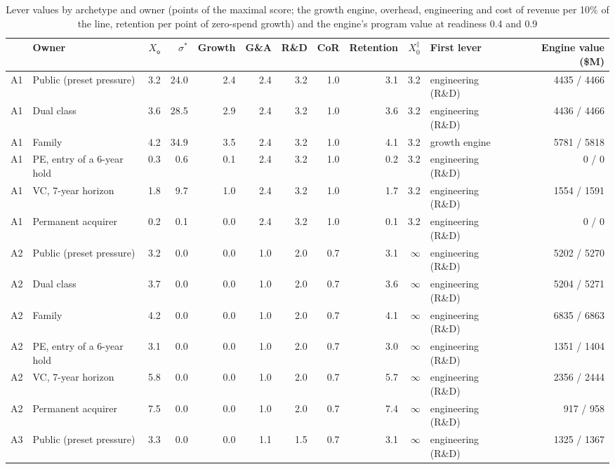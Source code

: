 \begin{table}[p]
\centering
\caption{Lever values by archetype and owner (points of the maximal score; the growth engine, overhead, engineering and cost of revenue per 10\% of the line, retention per point of zero-spend growth) and the engine's program value at readiness 0.4 and 0.9}\label{tab:playbook-grid}
\scriptsize
\setlength{\tabcolsep}{3pt}
\begin{tabular}{@{}llrrrrrrrrlr@{}}
\toprule
 & Owner & $X_{\mathsf o}$ & $\sigma^*$ & Growth & G\&A & R\&D & CoR & Retention & $X^\ddagger_0$ & First lever & Engine value (\$M) \\
\midrule
A1 & Public (preset pressure) & 3.2 & 24.0 & 2.4 & 2.4 & 3.2 & 1.0 & 3.1 & 3.2 & engineering (R\&D) & 4435 / 4466 \\
A1 & Dual class & 3.6 & 28.5 & 2.9 & 2.4 & 3.2 & 1.0 & 3.6 & 3.2 & engineering (R\&D) & 4436 / 4466 \\
A1 & Family & 4.2 & 34.9 & 3.5 & 2.4 & 3.2 & 1.0 & 4.1 & 3.2 & growth engine & 5781 / 5818 \\
A1 & PE, entry of a 6-year hold & 0.3 & 0.6 & 0.1 & 2.4 & 3.2 & 1.0 & 0.2 & 3.2 & engineering (R\&D) & 0 / 0 \\
A1 & VC, 7-year horizon & 1.8 & 9.7 & 1.0 & 2.4 & 3.2 & 1.0 & 1.7 & 3.2 & engineering (R\&D) & 1554 / 1591 \\
A1 & Permanent acquirer & 0.2 & 0.1 & 0.0 & 2.4 & 3.2 & 1.0 & 0.1 & 3.2 & engineering (R\&D) & 0 / 0 \\
\addlinespace
A2 & Public (preset pressure) & 3.2 & 0.0 & 0.0 & 1.0 & 2.0 & 0.7 & 3.1 & $\infty$ & engineering (R\&D) & 5202 / 5270 \\
A2 & Dual class & 3.7 & 0.0 & 0.0 & 1.0 & 2.0 & 0.7 & 3.6 & $\infty$ & engineering (R\&D) & 5204 / 5271 \\
A2 & Family & 4.2 & 0.0 & 0.0 & 1.0 & 2.0 & 0.7 & 4.1 & $\infty$ & engineering (R\&D) & 6835 / 6863 \\
A2 & PE, entry of a 6-year hold & 3.1 & 0.0 & 0.0 & 1.0 & 2.0 & 0.7 & 3.0 & $\infty$ & engineering (R\&D) & 1351 / 1404 \\
A2 & VC, 7-year horizon & 5.8 & 0.0 & 0.0 & 1.0 & 2.0 & 0.7 & 5.7 & $\infty$ & engineering (R\&D) & 2356 / 2444 \\
A2 & Permanent acquirer & 7.5 & 0.0 & 0.0 & 1.0 & 2.0 & 0.7 & 7.4 & $\infty$ & engineering (R\&D) & 917 / 958 \\
\addlinespace
A3 & Public (preset pressure) & 3.3 & 0.0 & 0.0 & 1.1 & 1.5 & 0.7 & 3.1 & $\infty$ & engineering (R\&D) & 1325 / 1367 \\

\end{tabular}
\end{table}

